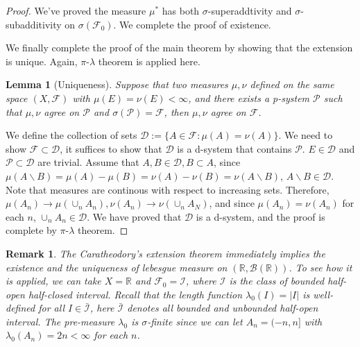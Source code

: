 \documentclass[11pt,english]{smfart}
\newtheorem{lemma}[theorem]{Lemma}
\newtheorem{remark}[theorem]{Remark}
\newcommand{\mb}{\mathbb}
\newcommand{\mc}{\mathcal}
\begin{document}
\begin{proof}
    We've proved the measure $\mu^*$ has both $\sigma$-superaddtivity and $\sigma$-subadditivity on $\sigma(\mc{F}_0)$. We complete the proof of existence. 
    
    We finally complete the proof of the main theorem by showing that the extension is unique. Again, $\pi$-$\lambda$ theorem is applied here. \\

    \begin{lemma}[Uniqueness]
        Suppose that two measures $\mu,\nu$ defined on the same space $(X,\mc{F})$ with $\mu(E) = \nu(E) < \infty$, and there exists a p-system $\mc{P}$ such that $\mu,\nu$ agree on $\mc{P}$ and $\sigma(\mc{P}) = \mc{F}$, then $\mu,\nu$ agree on $\mc{F}$.
    \end{lemma}

    We define the collection of sets $\mc{D} :=\{A\in \mc{F}: \mu({A}) = \nu(A)\}$. We need to show $\mc{F}\subset\mc{D}$, it suffices to show that $\mc{D}$ is a d-system that contains $\mc{P}$. $E \in \mc{D}$ and $\mc{P} \subset \mc{D}$ are trivial. Assume that $A,B \in \mc{D}, B\subset A$, since $\mu(A\backslash B) = \mu(A) - \mu(B) = \nu(A) - \nu(B) = \nu(A\backslash B)$, $A\backslash B \in \mc{D}$. Note that measures are continous with respect to increasing sets. Therefore, $\mu(A_n) \rightarrow \mu(\cup_{n}A_n),\nu(A_n) \rightarrow \nu(\cup_n A_N)$, and since $\mu(A_n) = \nu(A_n)$ for each $n$, $\cup_n A_n \in \mc{D}$. We have proved that $\mc{D}$ is a d-system, and the proof is complete by $\pi$-$\lambda$ theorem.
    \end{proof}

\begin{remark}
    The Caratheodory's extension theorem immediately implies the existence and the uniqueness of lebesgue measure on $(\mb{R},\mc{B}(\mb{R}))$. To see how it is applied, we can take $X = \mb{R}$ and $\mc{F}_0 = \mc{I}$, where $\mc{I}$ is the class of bounded half-open half-closed interval. Recall that the length function $\lambda_0 (I) = |I|$ is well-defined for all $I \in \bar{\mc{I}}$, here $\bar{\mc{I}}$ denotes all bounded and unbounded half-open interval. The pre-measure $\lambda_0$ is $\sigma$-finite since we can let $A_n = (-n,n] $ with $\lambda_0(A_n) = 2n < \infty$ for each $n$.\\
\end{remark}
\end{document}
